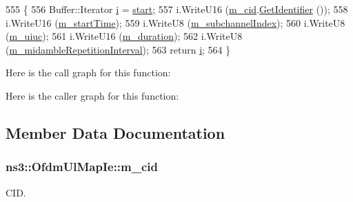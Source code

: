 \begin{DoxyCode}
555 \{
556   Buffer::Iterator \hyperlink{bernuolliDistribution_8m_a6f6ccfcf58b31cb6412107d9d5281426}{i} = \hyperlink{namespacevisualizer_1_1core_a2a35e5d8a34af358b508dac8635754e0}{start};
557   i.WriteU16 (\hyperlink{classns3_1_1OfdmUlMapIe_a0d44085d6dc47c63c9195d9c0c30232f}{m\_cid}.\hyperlink{classns3_1_1Cid_a8745a5cf5b7f2e5d142c4fb79072a053}{GetIdentifier} ());
558   i.WriteU16 (\hyperlink{classns3_1_1OfdmUlMapIe_ab287d97fe9e554867d7af2c28b73d28a}{m\_startTime});
559   i.WriteU8 (\hyperlink{classns3_1_1OfdmUlMapIe_a9d85926e578e48adc8e5b58ded98f3c7}{m\_subchannelIndex});
560   i.WriteU8 (\hyperlink{classns3_1_1OfdmUlMapIe_ab87646027e885948ad1eaa60585191fc}{m\_uiuc});
561   i.WriteU16 (\hyperlink{classns3_1_1OfdmUlMapIe_ae2a683311bd99a6f65db01acf5564653}{m\_duration});
562   i.WriteU8 (\hyperlink{classns3_1_1OfdmUlMapIe_aaaa11a58269b3257b3b61a2243525ea0}{m\_midambleRepetitionInterval});
563   \textcolor{keywordflow}{return} \hyperlink{bernuolliDistribution_8m_a6f6ccfcf58b31cb6412107d9d5281426}{i};
564 \}
\end{DoxyCode}


Here is the call graph for this function\+:




Here is the caller graph for this function\+:




\subsection{Member Data Documentation}
\subsubsection[{\texorpdfstring{m\+\_\+cid}{m_cid}}]{ ns3\+::\+Ofdm\+Ul\+Map\+Ie\+::m\+\_\+cid\hspace{0.3cm}{\ttfamily [private]}}\hypertarget{classns3_1_1OfdmUlMapIe_a0d44085d6dc47c63c9195d9c0c30232f}{}\label{classns3_1_1OfdmUlMapIe_a0d44085d6dc47c63c9195d9c0c30232f}


C\+ID. 


